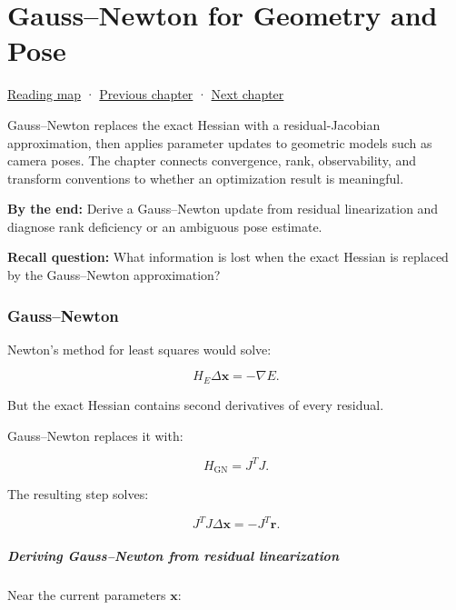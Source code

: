 \chapter{Gauss--Newton for Geometry and Pose}\label{02-foundations-ii-ch027-gaussnewton-for-geometry-and-pose}\hypertarget{02-foundations-ii-ch027}{}\label{stagechapter:02-foundations-ii-ch027}

\hyperref[volume-reading-map]{Reading map} · \hyperref[02-foundations-ii-ch026-matrix-functions-and-nonlinear-least-squares]{Previous chapter} · \hyperref[02-foundations-ii-ch028-reliable-optimization-and-root-finding]{Next chapter}

Gauss--Newton replaces the exact Hessian with a residual-Jacobian approximation, then applies parameter updates to geometric models such as camera poses. The chapter connects convergence, rank, observability, and transform conventions to whether an optimization result is meaningful.

\textbf{By the end:} Derive a Gauss--Newton update from residual linearization and diagnose rank deficiency or an ambiguous pose estimate.

\textbf{Recall question:} What information is lost when the exact Hessian is replaced by the Gauss--Newton approximation?

\subsection{Gauss--Newton}\label{02-foundations-ii-ch027-gaussnewton}

Newton's method for least squares would solve:

\[
H_E\Delta\mathbf x=-\nabla E.
\]

But the exact Hessian contains second derivatives of every residual.

Gauss--Newton replaces it with:

\[
H_{\mathrm{GN}}=J^TJ.
\]

The resulting step solves:

\[
\boxed{ J^TJ\Delta\mathbf x=-J^T\mathbf r }.
\]

\paragraph{Deriving Gauss--Newton from residual linearization}\label{02-foundations-ii-ch027-deriving-gaussnewton-from-residual-linearization}

Near the current parameters \(\mathbf x\):

